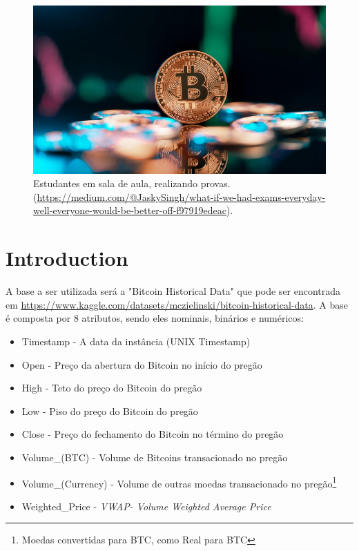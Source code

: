 \documentclass[sigplan,screen]{acmart}
\begin{document}
\begin{figure}[h]
  \centering
  \includegraphics[width=\linewidth]{btc.jpg}
  \caption{Estudantes em sala de aula, realizando provas. (\url{https://medium.com/@JaskySingh/what-if-we-had-exams-everyday-well-everyone-would-be-better-off-f97919edeac}).}
\end{figure}



\section{Introduction}
A base a ser utilizada será a "Bitcoin Historical Data" que pode ser encontrada em \url{https://www.kaggle.com/datasets/mczielinski/bitcoin-historical-data}.
A base é composta por 8 atributos, sendo eles nominais, binários e numéricos:
\begin{itemize}
    \item Timestamp - A data da instância (UNIX Timestamp) 
    \item Open - Preço da abertura do Bitcoin no início do pregão
    \item High - Teto do preço do Bitcoin do pregão
    \item Low - Piso do preço do Bitcoin do pregão
    \item Close - Preço do fechamento do Bitcoin no término do pregão
    \item Volume\_(BTC) - Volume de Bitcoins transacionado no pregão
    \item Volume\_(Currency) - Volume de outras moedas transacionado no pregão\footnote{Moedas convertidas para BTC, como Real para BTC}
    \item Weighted\_Price - \textit{VWAP- Volume Weighted Average Price}
\end{itemize}
\end{document}
